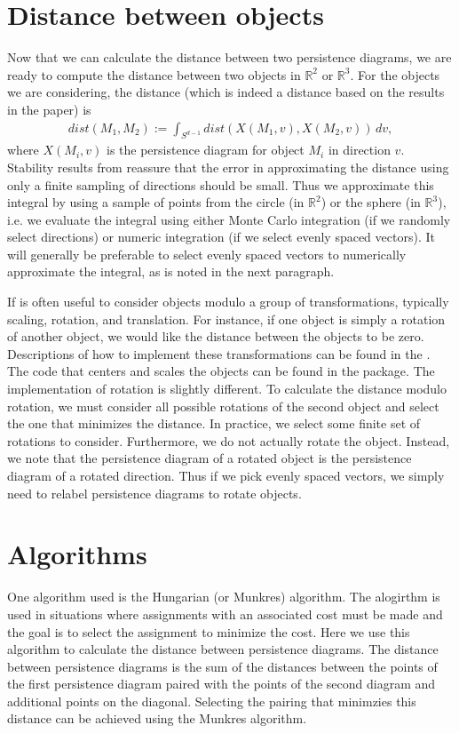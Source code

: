 \documentclass[codesnippet]{jss}
\begin{document}
\section[Distance objects]{Distance between objects}
Now that we can calculate the distance between two persistence diagrams, we are ready to compute the distance between two objects in $\mathbb{R}^2$ or $\mathbb{R}^3$.  For the objects we are considering, the distance (which is indeed a distance based on the results in the paper) is
\begin{align}
dist(M_1,M_2) := \int_{S^{d-1}} dist(X(M_1,v),X(M_2,v))\,dv,
\end{align}
where $X(M_i,v)$ is the persistence diagram for object $M_i$ in direction $v$.  Stability results from \cite{foo2010} reassure that the error in approximating the distance using only a finite sampling of directions should be small.  Thus we approximate this integral by using a sample of points from the circle (in $\mathbb{R}^2$) or the sphere (in $\mathbb{R}^3$), i.e. we evaluate the integral using either Monte Carlo integration (if we randomly select directions) or numeric integration (if we select evenly spaced vectors).  It will generally be preferable to select evenly spaced vectors to numerically approximate the integral, as is noted in the next paragraph.  

If is often useful to consider objects modulo a group of transformations, typically scaling, rotation, and translation. For instance, if one object is simply a rotation of another object, we would like the distance between the objects to be zero.  Descriptions of how to implement these transformations can be found in the \cite{foo2010}.  The code that centers and scales the objects can be found in the package.  The implementation of rotation is slightly different.  To calculate the distance modulo rotation, we must consider all possible rotations of the second object and select the one that minimizes the distance.  In practice, we select some finite set of rotations to consider.  Furthermore, we do not actually rotate the object.  Instead, we note that the persistence diagram of a rotated object is the persistence diagram of a rotated direction.  Thus if we pick evenly spaced vectors, we simply need to relabel persistence diagrams to rotate objects.

\section[algorithm]{Algorithms}
One algorithm used is the Hungarian (or Munkres) algorithm.  The alogirthm is used in situations where assignments with an associated cost must be made and the goal is to select the assignment to minimize the cost.  Here we use this algorithm to calculate the distance between persistence diagrams. The distance between persistence diagrams is the sum of the distances between the points of the first persistence diagram paired with the points of the second diagram and additional points on the diagonal.  Selecting the pairing that minimzies this distance can be achieved using the Munkres algorithm.
\end{document}
